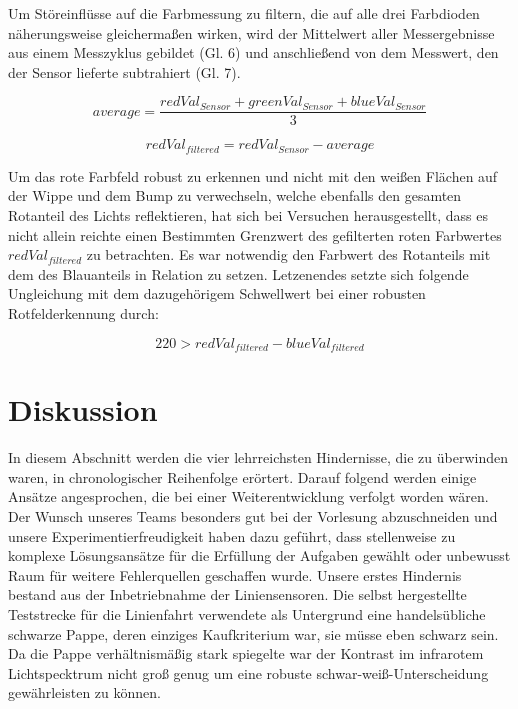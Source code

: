 \documentclass[12pt,a4paper,oneside]{article}
\begin{document}
\begin{spacing}{1.15}
Um Störeinflüsse auf die Farbmessung zu filtern, die auf alle drei Farbdioden näherungsweise gleichermaßen wirken, wird der Mittelwert aller Messergebnisse aus einem Messzyklus gebildet (Gl. 6) und anschließend von dem Messwert, den der Sensor lieferte subtrahiert (Gl. 7).
\begin{center}
	\begin{equation}
	average = \frac{redVal_{Sensor}+greenVal_{Sensor}+blueVal_{Sensor}}{3}
	\label{eq:kreisfahrt1}
	\end{equation}
	
	\begin{equation}
	redVal_{filtered} = redVal_{Sensor}-average
	\label{eq:kreisfahrt1}
	\end{equation}
\end{center}

Um das rote Farbfeld robust zu erkennen und nicht mit den weißen Flächen auf der Wippe und dem Bump zu verwechseln, welche ebenfalls den gesamten Rotanteil des Lichts reflektieren, hat sich bei Versuchen herausgestellt, dass es nicht allein reichte einen Bestimmten Grenzwert des gefilterten roten Farbwertes $redVal_{filtered}$ zu betrachten. Es war notwendig den Farbwert des Rotanteils mit dem des Blauanteils in Relation zu setzen. Letzenendes setzte sich folgende Ungleichung mit dem dazugehörigem Schwellwert bei einer robusten Rotfelderkennung durch:

\begin{center}
	\begin{equation}
	220 > redVal_{filtered} - blueVal_{filtered}
	\label{eq:kreisfahrt1}
	\end{equation}
\end{center}

	
	\section{Diskussion}
	
	In diesem Abschnitt werden die vier lehrreichsten Hindernisse, die zu überwinden waren, in chronologischer Reihenfolge erörtert. Darauf folgend werden einige Ansätze angesprochen, die bei einer Weiterentwicklung verfolgt worden wären.
	\\
	Der Wunsch unseres Teams besonders gut bei der Vorlesung abzuschneiden und unsere Experimentierfreudigkeit haben dazu geführt, dass stellenweise zu komplexe Lösungsansätze für die Erfüllung der Aufgaben gewählt oder unbewusst Raum für weitere Fehlerquellen geschaffen wurde. Unsere erstes Hindernis bestand aus der Inbetriebnahme der Liniensensoren. Die selbst hergestellte Teststrecke für die Linienfahrt verwendete als Untergrund eine handelsübliche schwarze Pappe, deren einziges Kaufkriterium war, sie müsse eben schwarz sein. Da die Pappe verhältnismäßig stark spiegelte war der Kontrast im infrarotem Lichtspecktrum nicht groß genug um eine robuste schwar-weiß-Unterscheidung gewährleisten zu können. 
	

\end{spacing}
\end{document}
